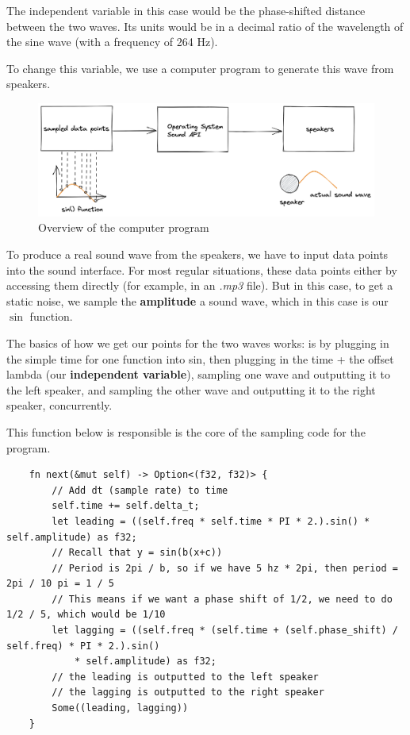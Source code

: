 \documentclass[index]{subfiles}
\begin{document}
The independent variable in this case would be the phase-shifted distance between the two waves. Its units would be in a decimal ratio of the wavelength of the sine wave (with a frequency of 264 Hz).

To change this variable, we use a computer program to generate this wave from speakers.

\begin{figure}[H]
    \centering
    \includegraphics[scale=0.2]{layout.png}
    \caption{Overview of the computer program}
\end{figure}

To produce a real sound wave from the speakers, we have to input data points into the sound interface. For most regular situations, these data points either by accessing them directly (for example, in an \textit{.mp3} file). But in this case, to get a static noise, we sample the \textbf{amplitude} a sound wave, which in this case is our \(\sin\) function.

The basics of how we get our points for the two waves works: is by plugging in the simple time for one function into sin, then plugging in the time + the offset lambda (our \textbf{independent variable}), sampling one wave and outputting it to the left speaker, and sampling the other wave and outputting it to the right speaker, concurrently.

This function below is responsible is the core of the sampling code for the program.

\begin{verbatim}
    fn next(&mut self) -> Option<(f32, f32)> {
        // Add dt (sample rate) to time
        self.time += self.delta_t;
        let leading = ((self.freq * self.time * PI * 2.).sin() * self.amplitude) as f32;
        // Recall that y = sin(b(x+c))
        // Period is 2pi / b, so if we have 5 hz * 2pi, then period = 2pi / 10 pi = 1 / 5
        // This means if we want a phase shift of 1/2, we need to do 1/2 / 5, which would be 1/10
        let lagging = ((self.freq * (self.time + (self.phase_shift) / self.freq) * PI * 2.).sin()
            * self.amplitude) as f32;
        // the leading is outputted to the left speaker
        // the lagging is outputted to the right speaker
        Some((leading, lagging))
    }
\end{verbatim}
\end{document}
